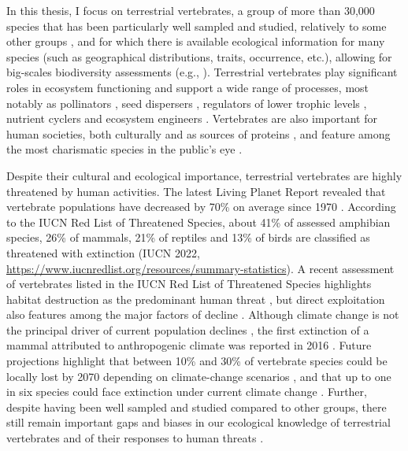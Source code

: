 In this thesis, I focus on terrestrial vertebrates, a group of more than 30,000 species that has been particularly well sampled and studied, relatively to some other groups \citep{Titley2017}, and for which there is available ecological information for many species (such as geographical distributions, traits, occurrence, etc.), allowing for big-scales biodiversity assessments (e.g., \citet{Jenkins2013}). Terrestrial vertebrates  play significant roles in ecosystem functioning and support a wide range of processes, most notably as pollinators \citep{Ratto2018}, seed dispersers \citep{Tiffney2004}, regulators of lower trophic levels \citep{Barber2010, Salo2010, Luck2012, Lin2018, Zhang2018_trophicinter}, nutrient cyclers \citep{Wilson2011, Inger2016, Cunningham2018} and ecosystem engineers \citep{Severtsov2012}. Vertebrates are also important for human societies, both culturally and as sources of proteins \citep{Hirons2016, Albert2018, Alves2018}, and feature among the most charismatic species in the public’s eye \citep{Courchamp2018, Albert2018}.

Despite their cultural and ecological importance, terrestrial vertebrates are highly threatened by human activities. The latest Living Planet Report revealed that vertebrate populations have decreased by 70\% on average since 1970 \citep{WWF2020}. According to the IUCN Red List of Threatened Species, about 41\% of assessed amphibian species, 26\% of mammals, 21\% of reptiles and 13\% of birds are classified as threatened with extinction (IUCN 2022, \url{https://www.iucnredlist.org/resources/summary-statistics}). A recent assessment of vertebrates listed in the IUCN Red List of Threatened Species highlights habitat destruction as the predominant human threat \citep{Cox2022}, but direct exploitation also features among the major factors of decline \citep{Monastersky2014}. Although climate change is not the principal driver of current population declines \citep{Caro2022}, the first extinction of a mammal attributed to anthropogenic climate was reported in 2016 \citep{Watson2016}. Future projections highlight that between 10\% and 30\% of vertebrate species could be locally lost by 2070 depending on climate-change scenarios \citep{Newbold2018}, and that up to one in six species could face extinction under current climate change \citep{Urban2015}. Further, despite having been well sampled and studied compared to other groups, there still remain important gaps and biases in our ecological knowledge of terrestrial vertebrates and of their responses to human threats \citep{Meyer2015, Meiri2016, Hevia2017, Oliver2021}.



